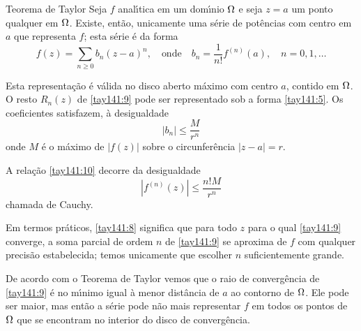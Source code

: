\begin{theoc}{Teorema de Taylor}{} Seja $f$ anal\'{\i}tica em um dom\'{\i}nio $\Omega$ e seja
$z=a$ um ponto qualquer em $\Omega$. Existe, ent\~{a}o, unicamente uma
s\'{e}rie de pot\^{e}ncias com centro em $a$ que representa $f$; esta
s\'{e}rie \'{e} da forma
\begin{equation}\label{tay141:9}
f(z)=\sum_{n\geq 0}b_n(z - a)^n,\quad \text{onde} \quad
b_n=\frac{1}{n!}f^{(n)}(a),\quad n=0,1,\ldots
\end{equation}

Esta representa\c{c}\~{a}o \'{e} v\'{a}lida no disco aberto m\'{a}ximo com centro $a$,
contido em $\Omega$. O resto $R_n(z)$ de \eqref{tay141:9} pode ser
representado sob a forma \eqref{tay141:5}. Os coeficientes
satisfazem, \`{a} desigualdade
\begin{equation}\label{tay141:10}
|b_n|\le \frac{M}{r^n}
\end{equation}
onde $M$ \'{e} o m\'{a}ximo de $|f(z)|$  sobre o circunfer\^{e}ncia $|z - a|=
r$.
\end{theoc}

A rela\c{c}\~{a}o \eqref{tay141:10} decorre da desigualdade
\begin{equation*}
  |f^{(n)}(z)|\le \frac{n!M}{r^n}
\end{equation*}
chamada de Cauchy.

Em termos pr\'{a}ticos, \eqref{tay141:8} significa que para todo $z$
para o qual \eqref{tay141:9} converge, a soma parcial de ordem $n$
de \eqref{tay141:9} se aproxima de $f$ com qualquer precis\~{a}o
estabelecida; temos unicamente que escolher $n$ suficientemente
grande.

De acordo com o Teorema de Taylor vemos que o raio de converg\^{e}ncia
de \eqref{tay141:9} \'{e} no m\'{\i}nimo igual \`{a} menor dist\^{a}ncia de $a$ ao
contorno de $\Omega$. Ele pode ser maior, mas ent\~{a}o a s\'{e}rie pode n\~{a}o
mais representar $f$ em todos os pontos de $\Omega$ que se encontram
no interior do disco de converg\^{e}ncia.

